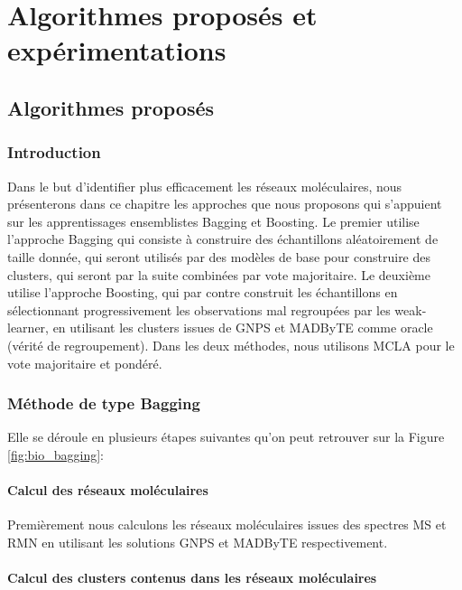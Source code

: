 \chapter{Algorithmes proposés et expérimentations}

\section{Algorithmes proposés}

\subsection{Introduction}

Dans le but d'identifier plus efficacement les réseaux moléculaires, nous présenterons dans ce chapitre les approches que nous proposons qui s'appuient sur les apprentissages ensemblistes Bagging et Boosting.
Le premier utilise l’approche \acrshort{Bagging} qui consiste à construire des échantillons aléatoirement de taille donnée, qui seront utilisés par des modèles de base pour construire des clusters, qui seront par la suite combinées par vote majoritaire.
Le deuxième utilise l’approche Boosting, qui par contre construit les échantillons en sélectionnant progressivement les observations mal regroupées par les weak-learner, en utilisant les clusters issues de \acrshort{GNPS} et \acrshort{MADByTE} comme oracle (vérité de regroupement).
Dans les deux méthodes, nous utilisons MCLA pour le vote majoritaire et pondéré.


\subsection{Méthode de type Bagging}

    Elle se déroule en plusieurs étapes suivantes qu'on peut retrouver sur la Figure \ref{fig:bio_bagging}:

    
    
   	 \subsubsection{Calcul des réseaux moléculaires}
  	 
		 Premièrement nous calculons les réseaux moléculaires issues des spectres MS et RMN en utilisant les solutions GNPS et MADByTE respectivement.
    
		 \subsubsection{Calcul des clusters contenus dans les réseaux moléculaires}
    
